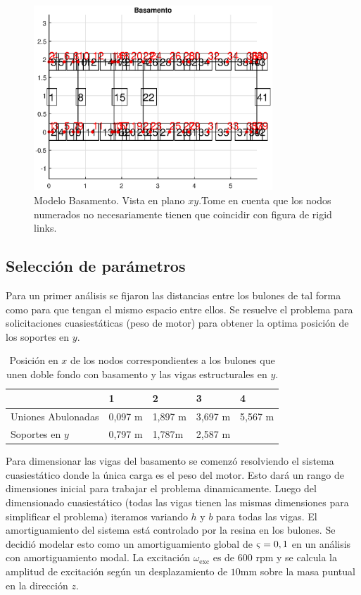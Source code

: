 \documentclass[onecolumn,10pt,titlepage,a4paper]{article}
\begin{document}
\begin{figure}[htb!]
	\centering
	\includegraphics[width=0.8\textwidth]{fig/modelbasamento.eps}
	\caption{Modelo Basamento. Vista en plano $x\!y$.Tome en cuenta que los nodos numerados no necesariamente tienen que coincidir con figura de rigid links.}
	\label{fig:modelobasamento}
\end{figure}

\subsection*{Selección de parámetros}
Para un primer análisis se fijaron las distancias entre los bulones de tal forma como para que tengan el mismo espacio entre ellos. Se resuelve el problema para solicitaciones cuasiestáticas (peso de motor) para obtener la optima posición de los soportes en $y$.


\begin{table}[htb!]
	\centering
	\begin{tabular}{lllll}
		& 1 & 2 & 3 & 4 \\ \hline
		Uniones Abulonadas& 0,097 \si{\meter}  & 1,897 \si{ \meter} & 3,697 \si{ \meter} & 5,567 \si{ \meter} \\
		Soportes en $y$& 0,797 \si{\meter}  &1,787\si{\meter}   & 2,587 \si{\meter}  &  \\
	\end{tabular}
\caption{Posición en $x$ de los nodos correspondientes a los bulones que unen doble fondo con basamento y las vigas estructurales en $y$.}
\end{table}

Para dimensionar las vigas del basamento se comenzó resolviendo el sistema cuasiestático donde la única carga es el peso del motor. Esto dará un rango de dimensiones inicial para trabajar el problema dinamicamente. Luego del dimensionado cuasiestático (todas las vigas tienen las mismas dimensiones para simplificar el problema) iteramos variando $h$ y $b$ para todas las vigas. El amortiguamiento del sistema está controlado por la resina en los bulones. Se decidió modelar esto como un amortiguamiento global de $\varsigma = 0,1$ en un análisis con amortiguamiento modal. La excitación $\omega_{\mathrm{exc}}$ es de 600 rpm y se calcula la amplitud de excitación según un desplazamiento de $10$mm sobre la masa puntual en la dirección $z$.
\end{document}
